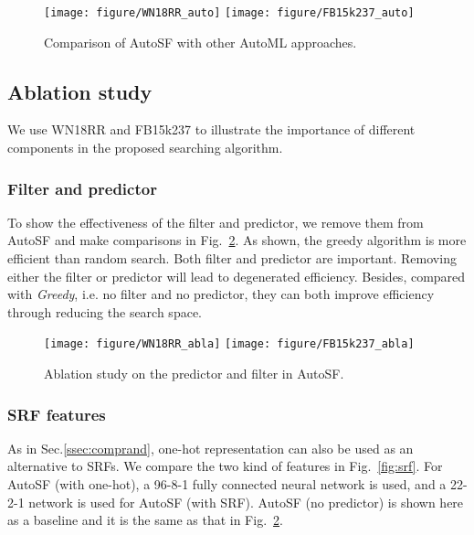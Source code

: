 \documentclass[conference]{IEEEtran}
\begin{document}
\begin{figure}[ht]
	\centering
	\vspace{-10px}
	\texttt{[image: figure/WN18RR\_auto]}
	\quad
	\texttt{[image: figure/FB15k237\_auto]}
	\vspace{-8px}
	\caption{Comparison of AutoSF with other AutoML approaches.}
	\label{fig:automl}
	\vspace{-15px}
\end{figure}

\subsection{Ablation study}
\label{ssec:ablation}
We use WN18RR and FB15k237 to illustrate the importance of different components
in the proposed searching algorithm.

\subsubsection{Filter and predictor}
\label{sub:fpref} 
To show the effectiveness of the filter and predictor, 
we remove them from AutoSF and make comparisons in 
Fig.~\ref{fig:filpre}.
As shown,
the greedy algorithm is more efficient than random search.
Both filter and predictor are important.
Removing either the filter or predictor will lead to degenerated efficiency.
Besides,
compared with \textit{Greedy},
i.e. no filter and no predictor,
they can both improve efficiency through reducing the search space.


\begin{figure}[ht]
	\centering
	\vspace{-8px}
	\texttt{[image: figure/WN18RR\_abla]}
	\quad
	\texttt{[image: figure/FB15k237\_abla]}
	\vspace{-10px}
	\caption{Ablation study on the predictor and filter in AutoSF.}
	\label{fig:filpre}
	\vspace{-8px}
\end{figure}

\subsubsection{SRF features} 
As in Sec.\ref{ssec:comprand},
one-hot representation \cite{liu2018progressive} can also be used as an alternative to SRFs.
We compare the two kind of features in Fig.~\ref{fig:srf}.
For AutoSF (with one-hot), a 96-8-1 fully connected neural network is used,
and a 22-2-1 network is used for AutoSF (with SRF).
AutoSF (no predictor) is shown here as a baseline 
and it is the same as that in Fig.~\ref{fig:filpre}.
\end{document}
